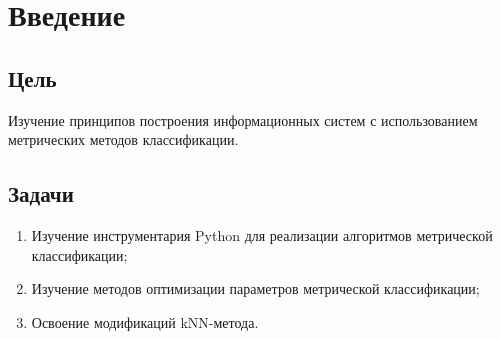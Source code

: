 \chapter{Введение}
\label{ch:intro}

\section{Цель}  

Изучение принципов построения
информационных систем с использованием метрических методов
классификации.


\section{Задачи} 

\begin{enumerate} 
\item Изучение инструментария Python для реализации алгоритмов метрической классификации;
\item Изучение методов оптимизации параметров метрической классификации;
\item Освоение модификаций kNN-метода.
\end{enumerate}
  

\endinput 